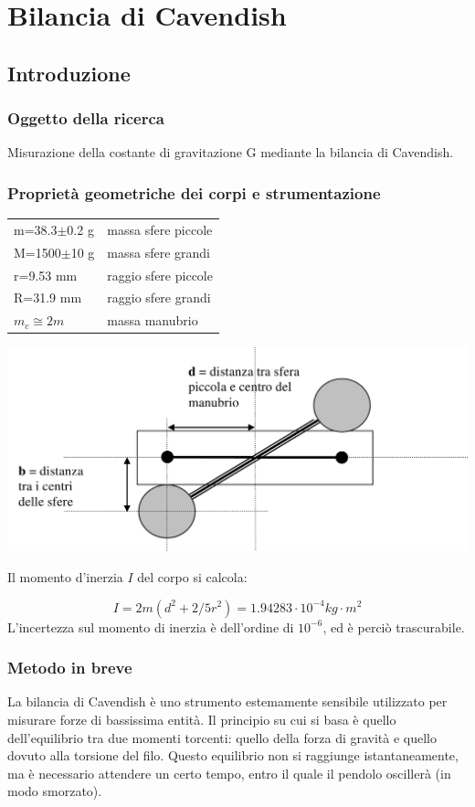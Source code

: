 \chapter{Bilancia di Cavendish}
\section{Introduzione}
\subsection{Oggetto della ricerca}
Misurazione della costante di gravitazione G mediante la bilancia di Cavendish.
\subsection{Proprietà geometriche dei corpi e strumentazione}

\begin{tabular}{ll}
m=38.3$\pm$0.2 g & massa sfere piccole\\
M=1500$\pm$10 g	 & massa sfere grandi\\
r=9.53 mm & raggio sfere piccole\\
R=31.9 mm	 & raggio sfere grandi\\
$m_c\cong 2m$ & massa manubrio\\
\end{tabular}


\begin{center}
 \includegraphics[scale=0.25]{../grafici/cavendish/schema.png}
\end{center}

Il momento d'inerzia $I$ del corpo si calcola:

$$ I=2m(d^2+2/5r^2) = 1.94283 \cdot 10^{-4} kg\cdot m^2$$
L'incertezza sul momento di inerzia è dell'ordine di $10^{-6}$, ed è perciò trascurabile. 
\subsection{Metodo in breve}
La bilancia di Cavendish è uno strumento estemamente sensibile utilizzato per misurare forze di bassissima entità. Il principio su cui si basa è quello dell'equilibrio tra due momenti torcenti: quello della forza di gravità e quello dovuto alla torsione del filo. Questo equilibrio non si raggiunge istantaneamente, ma è necessario attendere un certo tempo, entro il quale il pendolo oscillerà (in modo smorzato).

